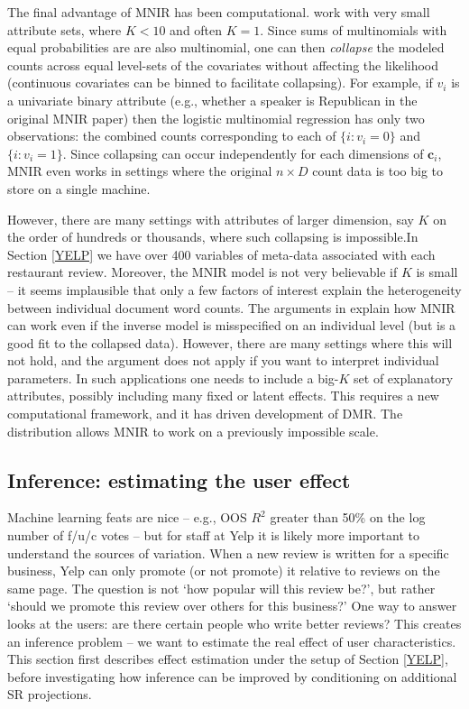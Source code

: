 \documentclass[12pt]{article}
\newcommand{\bm}[1]{\mathbf{#1}}
\begin{document}
The final advantage of MNIR has been computational.
\cite{taddy_multinomial_2013,taddy_measuring_2013} work with very small
attribute sets, where $K<10$ and often $K=1$.  Since sums of multinomials with
equal probabilities are are also multinomial, one can then {\it collapse} the
modeled counts across equal level-sets of the covariates without affecting the
likelihood (continuous covariates can be binned to facilitate collapsing).
For example, if $v_i$ is a univariate binary attribute (e.g., whether a
speaker is Republican in the original MNIR paper) then the logistic multinomial regression
  has only two observations: the combined counts
corresponding to each of $\{i:v_i=0\}$ and $\{i:v_i=1\}$. Since collapsing can
occur independently for each dimensions of $\bm{c}_i$,  MNIR  even
works in settings where the original $n\times D$ count data is too big to
store on a single machine.

However, there are many settings with attributes of  larger dimension, say $K$
on the order of hundreds or thousands, where such collapsing is impossible.In
Section \ref{YELP} we have over 400 variables of meta-data associated with
each restaurant review.  Moreover,  the MNIR model is not very believable if
$K$ is small -- it seems implausible that only a few factors of interest
explain the heterogeneity between individual document word counts. The
arguments in \cite{taddy_multinomial_2013,taddy_rejoinder:_2013} explain how
MNIR can work even if the inverse model is misspecified on an individual level
(but is a good fit to the collapsed data).  However, there are many settings
where this will not hold, and the argument does not apply if you want to
interpret individual parameters. In such applications one needs to
include a big-$K$ set of explanatory attributes, possibly including many fixed
or latent effects.   This requires a new computational framework, and it has
driven development of DMR.  The distribution allows MNIR to work on a
previously impossible scale.

\subsection{Inference: estimating the user effect}
\label{INFER}

Machine learning feats are nice -- e.g., OOS $R^2$ greater than 50\% on the
log number of f/u/c votes -- but for staff at Yelp it is likely more important
to understand the sources of variation.  When a new review is written for a
specific business, Yelp can only promote (or not promote) it relative to
reviews on the same page.  The question is not `how popular will this review
be?', but rather `should we promote this review over others for this
business?'  One way to answer looks at the users: are there certain people who
write better reviews?  This creates an inference problem -- we want to
estimate the real effect of user characteristics. This section first describes
effect estimation under the setup of Section \ref{YELP}, before investigating how
inference can be improved by conditioning on additional SR projections.
\end{document}
